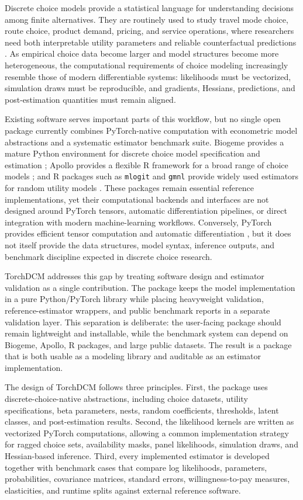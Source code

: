 Discrete choice models provide a statistical language for understanding decisions among finite alternatives.
They are routinely used to study travel mode choice, route choice, product demand, pricing, and service operations, where researchers need both interpretable utility parameters and reliable counterfactual predictions \citep{mcfadden1974conditional,train2009discrete}.
As empirical choice data become larger and model structures become more heterogeneous, the computational requirements of choice modeling increasingly resemble those of modern differentiable systems: likelihoods must be vectorized, simulation draws must be reproducible, and gradients, Hessians, predictions, and post-estimation quantities must remain aligned.

Existing software serves important parts of this workflow, but no single open package currently combines PyTorch-native computation with econometric model abstractions and a systematic estimator benchmark suite.
Biogeme provides a mature Python environment for discrete choice model specification and estimation \citep{bierlaire2023biogeme}; Apollo provides a flexible R framework for a broad range of choice models \citep{hess2019apollo}; and R packages such as \texttt{mlogit} and \texttt{gmnl} provide widely used estimators for random utility models \citep{croissant2020mlogit,sarrias2017gmnl}.
These packages remain essential reference implementations, yet their computational backends and interfaces are not designed around PyTorch tensors, automatic differentiation pipelines, or direct integration with modern machine-learning workflows.
Conversely, PyTorch provides efficient tensor computation and automatic differentiation \citep{paszke2019pytorch}, but it does not itself provide the data structures, model syntax, inference outputs, and benchmark discipline expected in discrete choice research.

TorchDCM addresses this gap by treating software design and estimator validation as a single contribution.
The package keeps the model implementation in a pure Python/PyTorch library while placing heavyweight validation, reference-estimator wrappers, and public benchmark reports in a separate validation layer.
This separation is deliberate: the user-facing package should remain lightweight and installable, while the benchmark system can depend on Biogeme, Apollo, R packages, and large public datasets.
The result is a package that is both usable as a modeling library and auditable as an estimator implementation.

The design of TorchDCM follows three principles.
First, the package uses discrete-choice-native abstractions, including choice datasets, utility specifications, beta parameters, nests, random coefficients, thresholds, latent classes, and post-estimation results.
Second, the likelihood kernels are written as vectorized PyTorch computations, allowing a common implementation strategy for ragged choice sets, availability masks, panel likelihoods, simulation draws, and Hessian-based inference.
Third, every implemented estimator is developed together with benchmark cases that compare log likelihoods, parameters, probabilities, covariance matrices, standard errors, willingness-to-pay measures, elasticities, and runtime splits against external reference software.

